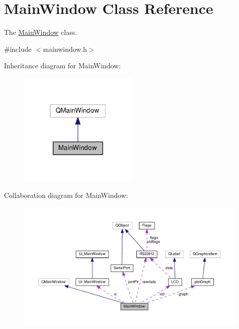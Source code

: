 \hypertarget{class_main_window}{\section{Main\-Window Class Reference}
\label{class_main_window}
}


The \hyperlink{class_main_window}{Main\-Window} class.  




{\ttfamily \#include $<$mainwindow.\-h$>$}



Inheritance diagram for Main\-Window\-:\nopagebreak
\begin{figure}[H]
\begin{center}
\leavevmode
\includegraphics[width=163pt]{class_main_window__inherit__graph}
\end{center}
\end{figure}


Collaboration diagram for Main\-Window\-:
\nopagebreak
\begin{figure}[H]
\begin{center}
\leavevmode
\includegraphics[width=350pt]{class_main_window__coll__graph}
\end{center}
\end{figure}
